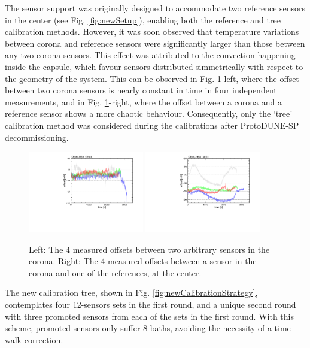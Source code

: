 The sensor support was originally designed to accommodate two reference sensors in the center (see Fig. \ref{fig:newSetup}), enabling both the reference and tree calibration methods. However, it was soon observed that temperature variations between corona and reference sensors were significantly larger than those between any two corona sensors. This effect was attributed to the convection happening inside the capsule, which favour sensors distributed simmetrically with respect to the geometry of the system. This can be observed in Fig. \ref{fig:refMethodDumpingJustification}-left, where the offset between two corona sensors is nearly constant in time in four independent measurements, and in Fig. \ref{fig:refMethodDumpingJustification}-right, where the offset between a corona and a reference sensor shows a more chaotic behaviour. Consequently, only the `tree' calibration method was considered during the calibrations after ProtoDUNE-SP decommissioning.

\begin{figure}[htbp]
\centering
{\includegraphics[width=0.45\textwidth]{images/figure_15_a.pdf}}
{\includegraphics[width=0.45\textwidth]{images/figure_15_b.pdf}}
\caption{Left: The 4 measured offsets between two arbitrary sensors in the corona. Right: The 4 measured offsets between a sensor in the corona and one of the references, at the center.}
\label{fig:refMethodDumpingJustification}
\end{figure}

The new calibration tree, shown in Fig. \ref{fig:newCalibrationStrategy}, contemplates four 12-sensors sets in the first round, and a unique second round with three promoted sensors from each of the sets in the first round. With this scheme, promoted sensors only suffer 8 baths, avoiding the necessity of a time-walk correction.

